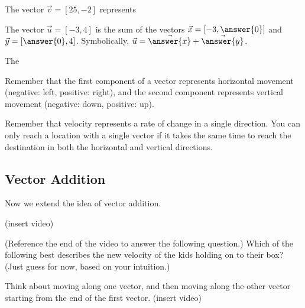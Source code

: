 \documentclass{ximera}
\begin{document}
\begin{problem}

The vector $\vec{v}=[25, -2]$ represents \begin{multipleChoice}
\end{multipleChoice}

The vector $\vec{u}=[-3,4]$ is the sum of the vectors $\vec{x}=[-3,\answer{0}]$ and $\vec{y}=[\answer{0},4]$. Symbolically, $\vec{u}=\vec{\answer{x}}+\vec{\answer{y}}$.

The 

\begin{feedback}
Remember that the first component of a vector represents horizontal movement (negative: left, positive: right), and the second component represents vertical movement (negative: down, positive: up).

Remember that velocity represents a rate of change in a single direction. You can only reach a location with a single vector if it takes the same time to reach the destination in both the horizontal and vertical directions.
\end{feedback}

\end{problem}

\subsection*{Vector Addition}

Now we extend the idea of vector addition.

(insert video)

\begin{problem}
(Reference the end of the video to answer the following question.)
Which of the following best describes the new velocity of the kids holding on to their box? (Just guess for now, based on your intuition.)
\begin{multipleChoice}
\end{multipleChoice}
\begin{feedback}
Think about moving along one vector, and then moving along the other vector starting from the end of the first vector.
(insert video)
\end{feedback}
\end{problem}
\end{document}
